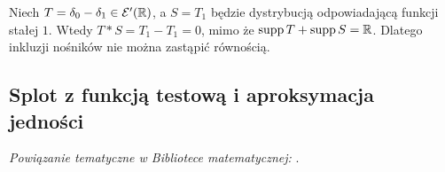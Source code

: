 \begin{przyklad}
\label{ex:support-strict21}
Niech $T=\delta_0-\delta_1\in\mathcal E'(\mathbb R)$,
a $S=T_1$ będzie dystrybucją odpowiadającą funkcji
stałej $1$. Wtedy $T*S=T_1-T_1=0$,
mimo że $\operatorname{supp} T+\operatorname{supp} S=\mathbb R$. Dlatego
inkluzji nośników nie można zastąpić równością.
\end{przyklad}

\subsection{Splot z funkcją testową i aproksymacja jedności}

\noindent\emph{Powiązanie tematyczne w Bibliotece matematycznej:} .


